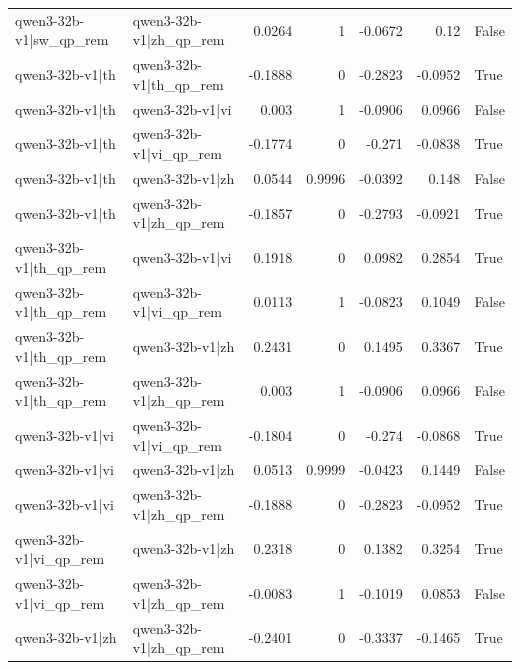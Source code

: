 \begin{table}
\begin{tabular}{l l r r r r l}
qwen3-32b-v1|sw_qp_rem & qwen3-32b-v1|zh_qp_rem & 0.0264 & 1 & -0.0672 & 0.12 & False \\
qwen3-32b-v1|th & qwen3-32b-v1|th_qp_rem & -0.1888 & 0 & -0.2823 & -0.0952 & True \\
qwen3-32b-v1|th & qwen3-32b-v1|vi & 0.003 & 1 & -0.0906 & 0.0966 & False \\
qwen3-32b-v1|th & qwen3-32b-v1|vi_qp_rem & -0.1774 & 0 & -0.271 & -0.0838 & True \\
qwen3-32b-v1|th & qwen3-32b-v1|zh & 0.0544 & 0.9996 & -0.0392 & 0.148 & False \\
qwen3-32b-v1|th & qwen3-32b-v1|zh_qp_rem & -0.1857 & 0 & -0.2793 & -0.0921 & True \\
qwen3-32b-v1|th_qp_rem & qwen3-32b-v1|vi & 0.1918 & 0 & 0.0982 & 0.2854 & True \\
qwen3-32b-v1|th_qp_rem & qwen3-32b-v1|vi_qp_rem & 0.0113 & 1 & -0.0823 & 0.1049 & False \\
qwen3-32b-v1|th_qp_rem & qwen3-32b-v1|zh & 0.2431 & 0 & 0.1495 & 0.3367 & True \\
qwen3-32b-v1|th_qp_rem & qwen3-32b-v1|zh_qp_rem & 0.003 & 1 & -0.0906 & 0.0966 & False \\
qwen3-32b-v1|vi & qwen3-32b-v1|vi_qp_rem & -0.1804 & 0 & -0.274 & -0.0868 & True \\
qwen3-32b-v1|vi & qwen3-32b-v1|zh & 0.0513 & 0.9999 & -0.0423 & 0.1449 & False \\
qwen3-32b-v1|vi & qwen3-32b-v1|zh_qp_rem & -0.1888 & 0 & -0.2823 & -0.0952 & True \\
qwen3-32b-v1|vi_qp_rem & qwen3-32b-v1|zh & 0.2318 & 0 & 0.1382 & 0.3254 & True \\
qwen3-32b-v1|vi_qp_rem & qwen3-32b-v1|zh_qp_rem & -0.0083 & 1 & -0.1019 & 0.0853 & False \\
qwen3-32b-v1|zh & qwen3-32b-v1|zh_qp_rem & -0.2401 & 0 & -0.3337 & -0.1465 & True \\
\bottomrule
\end{tabular}
\end{table}
